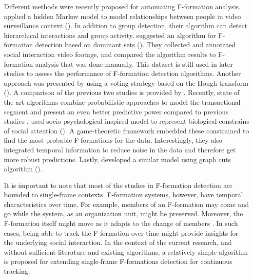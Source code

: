 \documentclass[]{simple-thesis}
\begin{document}
Different methods were recently proposed for automating F-formation analysis.
\citeauthor{Lin2010} applied a hidden Markov model to model relationships between people in video surveillance context (\citeyear{Lin2010}).
In addition to group detection, their algorithm can detect hierarchical interactions and group activity.
\citeauthor{Hung2011} suggested an algorithm for F-formation detection based on dominant sets (\citeyear{Hung2011}).
They collected and annotated social interaction video footage, and compared the algorithm results to F-formation analysis that was done manually.
This dataset is still used in later studies to assess the performance of F-formation detection algorithms.
Another approach was presented by \citeauthor{Cristani2011} using a voting strategy based on the Hough transform (\citeyear{Cristani2011}).
A comparison of the previous two studies is provided by \cite{Setti2013}.
Recently, state of the art algorithms combine probabilistic approaches to model the transactional segment and present an even better predictive power compared to previous studies \citep{Vascon2014, Setti2015}.
\citeauthor{Vascon2014} used socio-psychological inspired model to represent biological constrains of social attention (\citeyear{Vascon2014}).
A game-theoretic framework embedded these constrained to find the most probable F-formations for the data.
Interestingly, they also integrated temporal information to reduce noise in the data and therefore get more robust predictions.
Lastly, \citeauthor{Setti2015} developed a similar model using graph cuts algorithm (\citeyear{Setti2015}).

It is important to note that most of the studies in F-formation detection are bounded to single-frame contexts.
F-formation systems, however, have temporal characteristics over time.
For example, members of an F-formation may come and go while the system, as an organization unit, might be preserved.
Moreover, the F-formation itself might move as it adapts to the change of members \citep{Kendon1990}.
In such cases, being able to track the F-formation over time might provide insights for the underlying social interaction.
In the context of the current research, and without sufficient literature and existing algorithms, a relatively simple algorithm is proposed for extending single-frame F-formations detection for continuous tracking.
\end{document}
